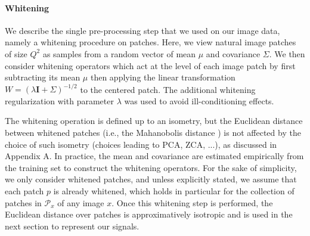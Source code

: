 \documentclass{article} %
\begin{document}
\paragraph{Whitening} We describe the single pre-processing step that we used on our image data, namely a whitening procedure on patches. %
Here, we view natural image patches of size $Q^2$ as samples from a random vector of mean $\mu$ and covariance   $\Sigma$. 
We then consider  whitening operators which act at the level of each image patch by first subtracting its mean $\mu$ then applying the linear transformation $W=(\lambda \mathbf{I}+\Sigma
)^{-1/2}$ to the centered patch. The additional whitening regularization with parameter $\lambda$ was used to avoid ill-conditioning effects.

The whitening operation is defined up to an isometry, but the Euclidean distance between whitened patches (i.e., the Mahanobolis distance \citep{chandra1936generalised}) is not affected by the choice of such isometry (choices leading to PCA, ZCA, ...), as discussed in Appendix A.
In practice,  the mean and covariance are estimated empirically from the training set to construct the whitening operators. For the sake of simplicity, we  only  consider whitened patches, and unless explicitly stated, we assume that each patch $p$ is already whitened, which holds in particular for the collection of patches in $\mathcal{P}_x$ of any image $x$. 
Once this whitening step is performed, the Euclidean distance over patches is approximatively isotropic and is used in the next section to represent our signals.
\end{document}
